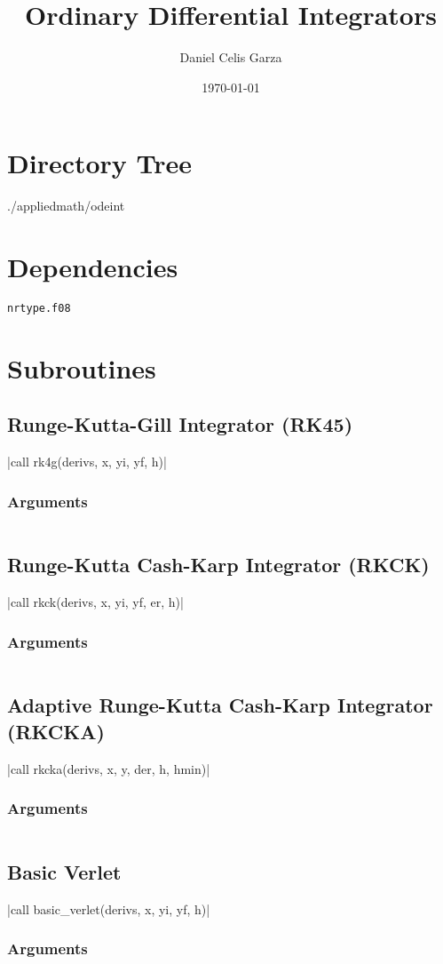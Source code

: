 \documentclass[11pt,a4paper]{article}
\title{Ordinary Differential Integrators}
\author{Daniel Celis Garza}
\date{\today}
\begin{document}
	\maketitle

	\section{Directory Tree}
		{\ubuntumono ./applied\textunderscore math/ode\textunderscore int}

	\section{Dependencies}
		\texttt{nrtype.f08}
	
	\section{Subroutines}
		\subsection{Runge-Kutta-Gill Integrator (RK45)}
			|call rk4g(derivs, x, yi, yf, h)|
			\subsubsection{Arguments}
				\inputminted[firstline=6, lastline=45]{fortran}{../ode_int.f08}
		\subsection{Runge-Kutta Cash-Karp Integrator (RKCK)}
			|call rkck(derivs, x, yi, yf, er, h)|
			\subsubsection{Arguments}
				\inputminted[firstline=67, lastline=123]{fortran}{../ode_int.f08}
		\subsection{Adaptive Runge-Kutta Cash-Karp Integrator (RKCKA)}
			|call rkcka(derivs, x, y, der, h, hmin)|
			\subsubsection{Arguments}
				\inputminted[firstline=249, lastline=282]{fortran}{../ode_int.f08}
		\subsection{Basic Verlet}
			|call basic_verlet(derivs, x, yi, yf, h)|
			\subsubsection{Arguments}
				\inputminted[firstline=295, lastline=328]{fortran}{../ode_int.f08}
\end{document}
